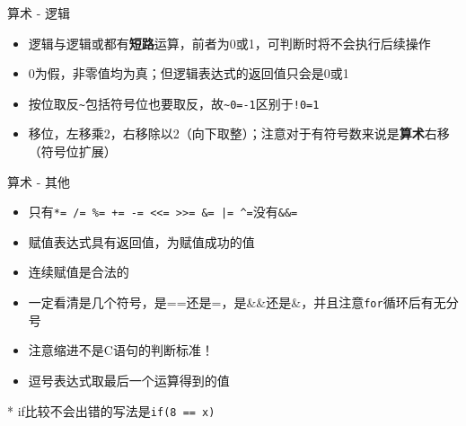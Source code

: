 \documentclass[UTF8]{ctexbeamer}
\begin{document}
\begin{frame}[fragile]{算术 - 逻辑}
\begin{itemize}[<+->]
	\item 逻辑与逻辑或都有\textbf{短路}运算，前者为0或1，可判断时将不会执行后续操作
	\item 0为假，非零值均为真；但逻辑表达式的返回值只会是0或1
	\item 按位取反\verb'~'包括符号位也要取反，故\verb'~0=-1'区别于\verb'!0=1'
	\item 移位，左移乘2，右移除以2（向下取整）；注意对于有符号数来说是\textbf{算术}右移（符号位扩展）
\end{itemize}
\end{frame}

\begin{frame}[fragile]{算术 - 其他}
\begin{itemize}[<+->]
	\item 只有\verb'*= /= %= += -= <<= >>= &= |= ^='没有\verb'&&='
	\item 赋值表达式具有返回值，为赋值成功的值
	\item 连续赋值是合法的
	\item 一定看清是几个符号，是==还是=，是\&\&还是\&，并且注意\verb'for'循环后有无分号
	\item 注意缩进不是C语句的判断标准！
	\item 逗号表达式取最后一个运算得到的值
\end{itemize}
\pause
* if比较不会出错的写法是\verb'if(8 == x)'
\end{frame}
\end{document}
